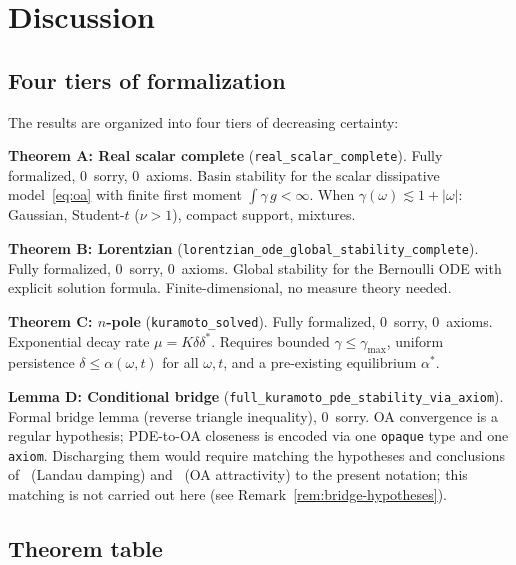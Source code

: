 \documentclass[11pt,a4paper]{article}
\theoremstyle{definition}
\begin{document}
\section{Discussion}\label{sec:discussion}

\subsection{Four tiers of formalization}

The results are organized into four tiers of decreasing certainty:

\medskip
\noindent\textbf{Theorem A: Real scalar complete} (\texttt{real\_scalar\_complete}). Fully formalized, 0~sorry, 0~axioms. Basin stability for the scalar dissipative model~\eqref{eq:oa} with finite first moment $\int \gamma\,g < \infty$. When $\gamma(\omega) \lesssim 1 + |\omega|$: Gaussian, Student-$t$ ($\nu > 1$), compact support, mixtures.

\medskip
\noindent\textbf{Theorem B: Lorentzian} (\texttt{lorentzian\_ode\_global\_stability\_complete}). Fully formalized, 0~sorry, 0~axioms. Global stability for the Bernoulli ODE with explicit solution formula. Finite-dimensional, no measure theory needed.

\medskip
\noindent\textbf{Theorem C: $n$-pole} (\texttt{kuramoto\_solved}). Fully formalized, 0~sorry, 0~axioms. Exponential decay rate $\mu = K\delta\delta^*$. Requires bounded $\gamma \leq \gamma_{\max}$, uniform persistence $\delta \leq \alpha(\omega,t)$ for all $\omega,t$, and a pre-existing equilibrium $\alpha^*$.

\medskip
\noindent\textbf{Lemma D: Conditional bridge} (\texttt{full\_kuramoto\_pde\_stability\_via\_axiom}). Formal bridge lemma (reverse triangle inequality), 0~sorry. OA convergence is a regular hypothesis; PDE-to-OA closeness is encoded via one \texttt{opaque} type and one \texttt{axiom}. Discharging them would require matching the hypotheses and conclusions of~\cite{dietert2017} (Landau damping) and~\cite{dietert-fernandez2018} (OA attractivity) to the present notation; this matching is not carried out here (see Remark~\ref{rem:bridge-hypotheses}).

\subsection{Theorem table}
\end{document}

